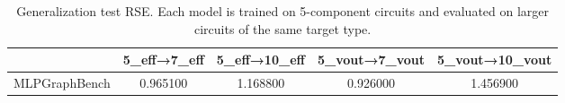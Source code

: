 \begin{table}
\caption{Generalization test RSE. Each model is trained on 5-component circuits and evaluated on larger circuits of the same target type.}
\label{tab:generalization_graphbench_results}
\begin{tabular}{lcccc}
\toprule
 & 5_eff→7_eff & 5_eff→10_eff & 5_vout→7_vout & 5_vout→10_vout \\
\midrule
MLPGraphBench & 0.965100 & 1.168800 & 0.926000 & 1.456900 \\
\bottomrule
\end{tabular}
\end{table}
